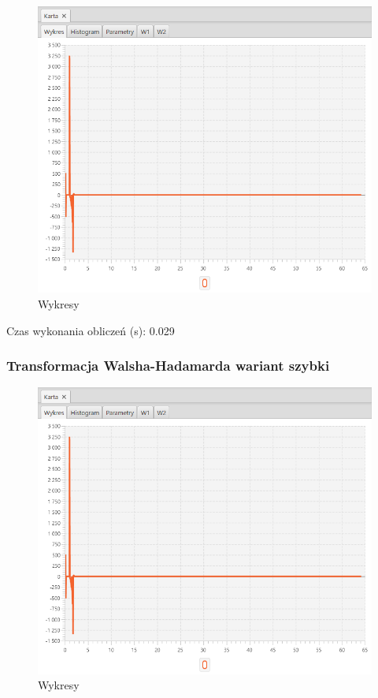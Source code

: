 \documentclass[12pt]{article}
\begin{document}
{{{                \begin{figure}[H]
                    \centering
                    \includegraphics[width=\textwidth]{img/result/s3/06/data_draw_6_sinus_sampling_trans_s3_data_205946.png}
                    \caption{Wykresy}
                \end{figure}

                Czas wykonania obliczeń (s): 0.029
            }
            \newpage

            \subsubsection{Transformacja Walsha-Hadamarda wariant szybki} {

                \begin{figure}[H]
                    \centering
                    \includegraphics[width=\textwidth]{img/result/s3/07/data_draw_7_sinus_sampling_trans_s3_data_205955.png}
                    \caption{Wykresy}
                \end{figure}

}}}
\end{document}
